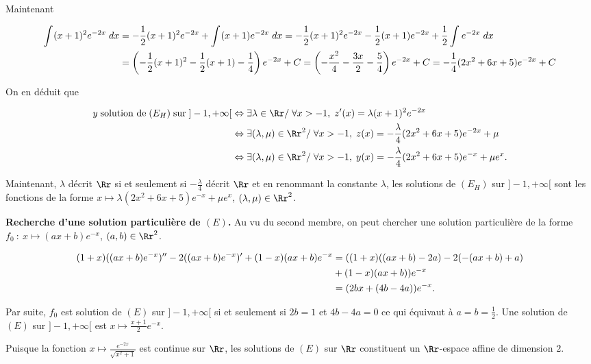 {\begin{enumerate}
{Maintenant

\begin{align*}\ensuremath
\int_{}^{}(x+1)^2e^{-2x}\;dx&=- \frac{1}{2}(x+1)^2e^{-2x}+\int_{}^{}(x+1)e^{-2x}\;dx=- \frac{1}{2}(x+1)^2e^{-2x}- \frac{1}{2}(x+1)e^{-2x}+ \frac{1}{2}\int_{}^{}e^{-2x}\;dx\\
 &=\left(- \frac{1}{2}(x+1)^2- \frac{1}{2}(x+1)- \frac{1}{4}\right)e^{-2x}+C=\left(- \frac{x^2}{4}- \frac{3x}{2}- \frac{5}{4}\right)e^{-2x}+C=- \frac{1}{4}(2x^2+6x+5)e^{-2x}+C
\end{align*}

On en déduit que

\begin{align*}\ensuremath
y\;\text{solution de}\;(E_H)\;\text{sur}\;]-1,+\infty[&\Leftrightarrow\exists\lambda\in\Rr/\;\forall x>-1,\;z'(x)=\lambda(x+1)^2e^{-2x}\\
 &\Leftrightarrow\exists(\lambda,\mu)\in\Rr^2/\;\forall x>-1,\;z(x)=- \frac{\lambda}{4}(2x^2+6x+5)e^{-2x}+\mu\\
 &\Leftrightarrow\exists(\lambda,\mu)\in\Rr^2/\;\forall x>-1,\;y(x)=- \frac{\lambda}{4}(2x^2+6x+5)e^{-x}+\mu e^x.
\end{align*}

Maintenant, $\lambda$ décrit $\Rr$ si et seulement si $- \frac{\lambda}{4}$ décrit $\Rr$ et en renommant la constante $\lambda$, les solutions de $(E_H)$ sur $]-1,+\infty[$ sont les fonctions de la forme $x\mapsto\lambda(2x^2+6x+5)e^{-x}+\mu e^x$, $(\lambda,\mu)\in\Rr^2$.

\textbf{Recherche d'une solution particulière de $(E)$.} Au vu du second membre, on peut chercher une solution particulière de la forme $f_0~:~x\mapsto(ax+b)e^{-x}$, $(a,b)\in\Rr^2$.

\begin{align*}\ensuremath
(1+x)((ax+b)e^{-x})''-2((ax+b)e^{-x})'+(1-x)(ax+b)e^{-x}&=((1+x)((ax+b)-2a)-2(-(ax+b)+a)\\
 &+(1-x)(ax+b))e^{-x}\\
 &=(2bx+(4b-4a))e^{-x}.
\end{align*}

Par suite, $f_0$ est solution de $(E)$ sur $]-1,+\infty[$ si et seulement si $2b=1$ et $4b-4a=0$ ce qui équivaut à $a=b= \frac{1}{2}$. Une solution de $(E)$ sur $]-1,+\infty[$ est $x\mapsto \frac{x+1}{2}e^{-x}$.

\begin{center}
\shadowbox{
$\mathcal{S}_{]-1,+\infty[}=\left\{x\mapsto\lambda(2x^2+6x+5)e^{-x}+\mu e^x+ \frac{x+1}{2}e^{-x},\;(\lambda,\mu)\in\Rr^2\right\}$.
}
\end{center}
Puisque la fonction $x\mapsto \frac{e^{-2x}}{\sqrt{x^2+1}}$ est continue sur $\Rr$, les solutions de $(E)$ sur $\Rr$ constituent un $\Rr$-espace affine de dimension $2$.

}
\end{enumerate}}

